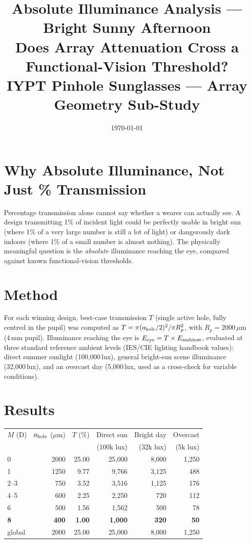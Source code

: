 \documentclass[11pt]{article}
\title{Absolute Illuminance Analysis --- Bright Sunny Afternoon\\
\large Does Array Attenuation Cross a Functional-Vision Threshold?\\
\normalsize IYPT Pinhole Sunglasses --- Array Geometry Sub-Study}
\author{}
\date{\today}
\begin{document}
\maketitle

\section{Why Absolute Illuminance, Not Just \% Transmission}
Percentage transmission alone cannot say whether a wearer can actually
see. A design transmitting 1\% of incident light could be perfectly
usable in bright sun (where 1\% of a very large number is still a lot of
light) or dangerously dark indoors (where 1\% of a small number is almost
nothing). The physically meaningful question is the \emph{absolute}
illuminance reaching the eye, compared against known functional-vision
thresholds.

\section{Method}
For each winning design, best-case transmission $T$ (single active hole,
fully centred in the pupil) was computed as
$T = \pi(a_{\rm hole}/2)^2 / \pi R_p^2$, with $R_p=2000\,\mu$m (4\,mm
pupil). Illuminance reaching the eye is $E_{\rm eye} = T \times E_{\rm
ambient}$, evaluated at three standard reference ambient levels (IES/CIE
lighting handbook values): direct summer sunlight (100{,}000\,lux),
general bright-sun scene illuminance (32{,}000\,lux), and an overcast day
(5{,}000\,lux, used as a cross-check for variable conditions).

\section{Results}
\begin{center}
\begin{tabular}{lrrrrr}
\toprule
$M$ (D) & $a_{\rm hole}$ ($\mu$m) & $T$ (\%) & Direct sun & Bright day & Overcast \\
 & & & (100k lux) & (32k lux) & (5k lux) \\
\midrule
0 & 2000 & 25.00 & 25{,}000 & 8{,}000 & 1{,}250 \\
1 & 1250 & 9.77 & 9{,}766 & 3{,}125 & 488 \\
2--3 & 750 & 3.52 & 3{,}516 & 1{,}125 & 176 \\
4--5 & 600 & 2.25 & 2{,}250 & 720 & 112 \\
6 & 500 & 1.56 & 1{,}562 & 500 & 78 \\
\textbf{8} & \textbf{400} & \textbf{1.00} & \textbf{1{,}000} & \textbf{320} & \textbf{50} \\
global & 2000 & 25.00 & 25{,}000 & 8{,}000 & 1{,}250 \\
\bottomrule
\end{tabular}
\end{center}
\end{document}
